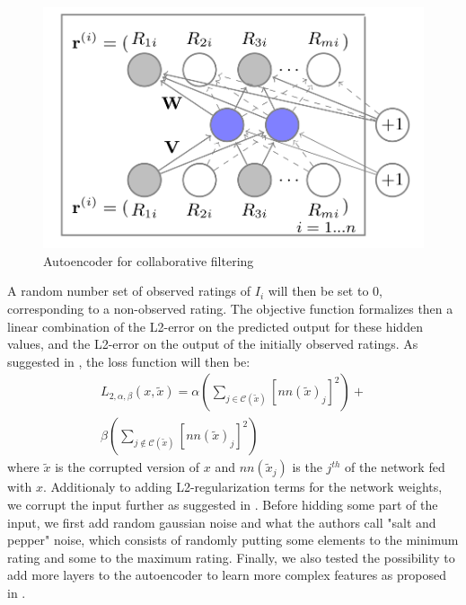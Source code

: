 \documentclass[10pt,conference,compsocconf]{IEEEtran}
\begin{document}
\begin{description}
\begin{figure}[t!]
\centering
\includegraphics[scale=0.25]{autoenc.png}
\caption{Autoencoder for collaborative filtering \cite{autorec}}
\label{autoenc}
\end{figure} 
A random number set of observed ratings of $I_{i}$ will then be set to 0, corresponding to a non-observed rating. The objective function formalizes then a linear combination of the L2-error on the predicted output for these hidden values, and the L2-error on the output of the initially observed ratings.
As suggested in \cite{DBLP:journals/corr/StrubMG16}, the loss function will then be: 
$$
\begin{aligned}
L_{2,\alpha,\beta}(x,\widetilde{x}) = \alpha(\sum\limits_{j \in \mathcal{C}(\widetilde{x})} [nn(\widetilde{x})_{j}]^{2})+ \\ \beta(\sum\limits_{j \notin \mathcal{C}(\widetilde{x})} [nn(\widetilde{x})_{j}]^{2})
\end{aligned}
$$
where $\widetilde{x}$ is the corrupted version of $x$ and $nn(\widetilde{x}_j)$ is the $j^{th}$ of the network fed with $x$. 
\newline
Additionaly to adding L2-regularization terms for the network weights, we corrupt the input further as suggested in \cite{Vincent:2010:SDA:1756006.1953039}. Before hidding some part of the input, we first add random gaussian noise and what the authors call "salt and pepper" noise, which consists of randomly putting some elements to the minimum rating and some to the maximum rating.
\newline 
Finally, we also tested the possibility to add more layers to the autoencoder to learn more complex features as proposed in \cite{Kuchaiev2017TrainingDA}. 

\end{description}
\end{document}
